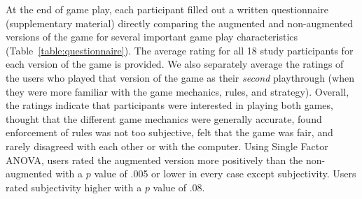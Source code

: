 At the end of game play, each participant filled out a written
questionnaire (supplementary material)
directly comparing the augmented and non-augmented versions of the
game 
for several important game play characteristics
%
(Table~\ref{table:questionnaire}).  The average rating for all 18 study
participants for each version of the game is provided.  We also
separately average the ratings of the users who played that version of
the game as their \emph{second} playthrough (when they were more
familiar with the game mechanics, rules, and strategy). 
%
Overall, the ratings indicate that participants were interested in
playing both games, thought that the different game mechanics were
generally accurate, found enforcement of rules was not too subjective,
felt that the game was fair, and rarely disagreed with each other or
with the computer.  
Using Single Factor ANOVA, users rated the augmented version 
more positively than the non-augmented with a $p$ value of .005 or lower in every 
case except subjectivity.  Users rated subjectivity higher with a $p$ value of .08.

